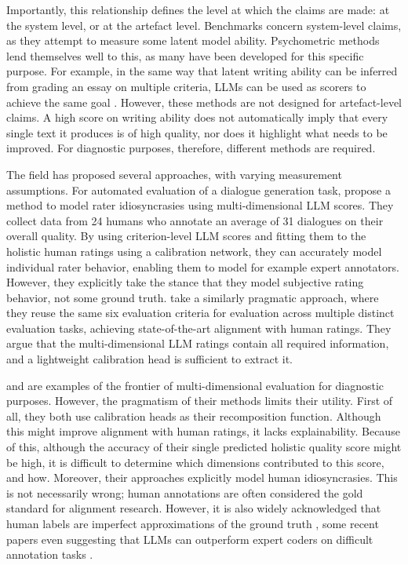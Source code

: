 Importantly, this relationship defines the level at which the claims are made: at the system level, or at the artefact level. Benchmarks concern system-level claims, as they attempt to measure some latent model ability. Psychometric methods lend themselves well to this, as many have been developed for this specific purpose. For example, in the same way that latent writing ability can be inferred from grading an essay on multiple criteria, LLMs can be used as scorers to achieve the same goal \citep{wang2025evaluating}. However, these methods are not designed for artefact-level claims. A high score on writing ability does not automatically imply that every single text it produces is of high quality, nor does it highlight what needs to be improved. For diagnostic purposes, therefore, different methods are required.

The field has proposed several approaches, with varying measurement assumptions. For automated evaluation of a dialogue generation task, \citet{hashemi_llm-rubric_2024} propose a method to model rater idiosyncrasies using multi-dimensional LLM scores. They collect data from 24 humans who annotate an average of 31 dialogues on their overall quality. By using criterion-level LLM scores and fitting them to the holistic human ratings using a calibration network, they can accurately model individual rater behavior, enabling them to model for example expert annotators. However, they explicitly take the stance that they model subjective rating behavior, not some ground truth. \citet{kolaSAJASimpleApproach2026} take a similarly pragmatic approach, where they reuse the same six evaluation criteria for evaluation across multiple distinct evaluation tasks, achieving state-of-the-art alignment with human ratings. They argue that the multi-dimensional LLM ratings contain all required information, and a lightweight calibration head is sufficient to extract it. 


\citet{hashemi_llm-rubric_2024} and \citet{kolaSAJASimpleApproach2026} are examples of the frontier of multi-dimensional evaluation for diagnostic purposes. However, the pragmatism of their methods limits their utility. First of all, they both use calibration heads as their recomposition function. Although this might improve alignment with human ratings, it lacks explainability. Because of this, although the accuracy of their single predicted holistic quality score might be high, it is difficult to determine which dimensions contributed to this score, and how. Moreover, their approaches explicitly model human idiosyncrasies. This is not necessarily wrong; human annotations are often considered the gold standard for alignment research. However, it is also widely acknowledged that human labels are imperfect approximations of the ground truth \citep{zhaoChallengesTrustworthyHuman}, some recent papers even suggesting that LLMs can outperform expert coders on difficult annotation tasks \citep{tornbergLargeLanguageModels2025}. 

